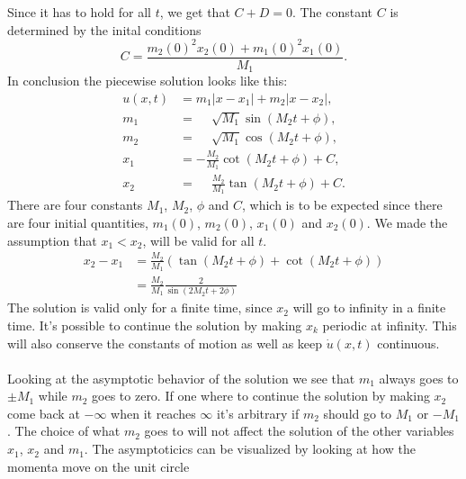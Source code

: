 \documentclass[english,master]{liumaiex}
\theoremstyle{plain}
\theoremstyle{definition}
\begin{document}
%
Since it has to hold for all $t$, we get that $C + D = 0$. The constant $C$ is determined by the inital conditions
\begin{equation}
	C = \frac{m_2(0)^2 x_2(0) + m_1(0)^2 x_1(0)}{M_1}.
\end{equation}
In conclusion the piecewise solution looks like this:
\begin{align}
	u(x, t) &= m_1|x - x_1| + m_2|x - x_2|, \\
	m_1 &= \phantom{-}\sqrt{M_1} \sin(M_2t + \phi), \\
	m_2 &= \phantom{-}\sqrt{M_1} \cos(M_2t + \phi), \\
	x_1 &= -\frac{M_2}{M_1}\cot(M_2t + \phi) + C, \\
	x_2 &= \phantom{-}\frac{M_2}{M_1}\tan(M_2t + \phi) + C.
\end{align}
%
There are four constants $M_1$, $M_2$, $\phi$ and $C$, which is to be expected since there are four initial quantities, $m_1(0)$, $m_2(0)$, $x_1(0)$ and $x_2(0)$. We made the assumption that $x_1 < x_2$, will be valid for all $t$.
\begin{equation}
\begin{aligned}
	x_2 - x_1 
	&= \frac{M_2}{M_1}(\tan(M_2t + \phi) + \cot(M_2t + \phi)) \\
	&= \frac{M_2}{M_1}\frac{2}{\sin(2M_2t + 2\phi)}
\end{aligned}
\end{equation}
The solution is valid only for a finite time, since $x_2$ will go to infinity in a finite time. It's possible to continue the solution by making $x_k$ periodic at infinity. This will also conserve the constants of motion as well as keep $\dot{u}(x, t)$ continuous.
\\ \\
Looking at the asymptotic behavior of the solution we see that $m_1$ always goes to $\pm M_1$ while $m_2$ goes to zero. If one where to continue the solution by making $x_2$ come back at $-\infty$ when it reaches $\infty$ it's arbitrary if $m_2$ should go to $M_1$ or $-M_1$. The choice of what $m_2$ goes to will not affect the solution of the other variables $x_1$, $x_2$ and $m_1$. The asymptoticics can be visualized by looking at how the momenta move on the unit circle
\end{document}
